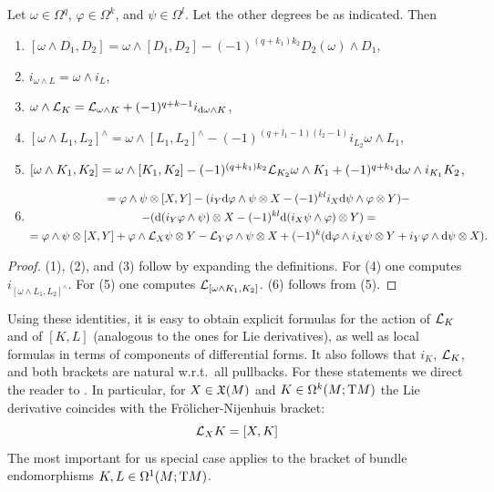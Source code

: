 \begin{thm}
    Let $\omega\in\Omega^q$, $\varphi\in\Omega^k$, and $\psi\in\Omega^l$. Let the other degrees be as indicated. Then 
    \begin{enumerate}[label=(\arabic*)]
        \item $[\omega\wedge D_1,D_2]=\omega\wedge [D_1,D_2]-(-1)^{(q+k_1)k_2}D_2(\omega)\wedge D_1$,
        \item $i_{\omega\wedge L}=\omega\wedge i_L$,
        \item $\omega\wedge\mathcal{L}_K=\mathcal{L}_{\omega\wedge K}+(-1)^{q+k-1}i_{{\mathrm{d}}\omega\wedge K}$,
        \item $[\omega\wedge L_1,L_2]^{\wedge}=\omega\wedge [L_1,L_2]^{\wedge}-(-1)^{(q+l_1-1)(l_2-1)}i_{L_2}\omega\wedge L_1$,
        \item $[\omega\wedge K_1,K_2]=\omega\wedge [K_1,K_2]-(-1)^{(q+k_1)k_2}\mathcal{L}_{K_2}\omega\wedge K_1+(-1)^{q+k_1}{\mathrm{d}}\omega\wedge i_{K_1}K_2$,
        \item \begin{multline}
            [\varphi\otimes X,\psi\otimes Y]=\varphi\wedge \psi\otimes[X,Y]
            -(i_Y\dd\varphi\wedge\psi\otimes X-(-1)^{kl}i_X\dd\psi\wedge\varphi\otimes Y)-\\
            -(\dd(i_Y\varphi\wedge\psi)\otimes X-(-1)^{kl}\dd(i_X\psi\wedge\varphi)\otimes Y)=\\
            =\varphi\wedge\psi\otimes [X,Y]+\varphi\wedge \Lie_X\psi\otimes Y-\Lie_Y\varphi\wedge\psi\otimes X+(-1)^{k}(\dd\varphi\wedge i_X\psi\otimes Y+i_Y\varphi\wedge\dd\psi\otimes X).
        \end{multline}
    \end{enumerate}
\end{thm}
\begin{proof}
    (1), (2), and (3) follow by expanding the definitions. For (4) one computes $i_{[\omega\wedge L_1,L_2]^{\wedge}}$. For (5) one computes $\mathcal{L}_{[\omega\wedge K_1,K_2]}$. (6) follows from (5).
\end{proof}

Using these identities, it is easy to obtain explicit formulas for the action of $\mathcal{L}_K$ and of $[K,L]$ (analogous to the ones for Lie derivatives), as well as local formulas in terms of components of differential forms. It also follows that $i_K$, $\mathcal{L}_K$, and both brackets are natural w.r.t.\ all pullbacks. For these statements we direct the reader to \cite[\S8]{Kolar}. In particular, for $X\in\mathfrak{X}(M)$ and $K\in\Omega^k(M;\mathrm{T} M)$ the Lie derivative coincides with the Fr\"olicher-Nijenhuis bracket:
\[\mathcal{L}_X K=[X,K]\]
The most important for us special case applies to the bracket of bundle endomorphisms $K,L\in\Omega^1(M;\mathrm{T} M)$.

